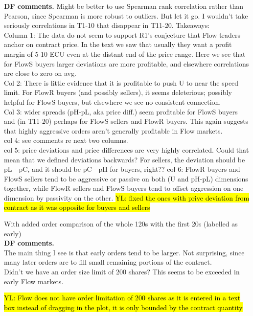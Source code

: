 \documentclass{article}
\begin{document}
\textbf{DF comments.} Might be better to use Spearman rank correlation rather than Pearson,
since Spearman is more robust to outliers. But let it go. 
I wouldn't take seriously correlations in T1-10 that disappear in T11-20.
Takeaways: \\
Column 1: The data do not seem to support R1's conjecture that Flow traders anchor on contract price. In the text we saw that usually they want a profit margin of 5-10 ECU even at the distant end of the price range. Here we see that for FlowS buyers larger deviations are more profitable, and elsewhere correlations are close to zero on avg.\\
Col 2: There is little evidence that it is profitable to push U to near the speed limit. For FlowR buyers (and possibly sellers), it seems deleterious;  possibly helpful for FlowS buyers, but elsewhere we see no consistent connection. \\
Col 3: wider spreads (pH-pL, aka price diff.) seem profitable for FlowS buyers and (in T11-20) perhaps for FlowS sellers and FlowR buyers.
This again suggests that highly aggressive orders aren't generally profitable in Flow markets. \\
col 4: see comments re next two columns. \\
col 5: price deviations and price differences are very highly correlated.
Could that mean that we defined deviations backwards?
For sellers, the deviation should be pL - pC, and it should be pC - pH for buyers, right?? 
col 6: FlowR buyers and FlowS sellers tend to be aggressive or passive on both (U and pH-pL) dimensions together, while FlowR sellers and FlowS buyers tend to offset aggression on one dimension by passivity on the other. 
\hl{YL: fixed the ones with prive deviation from contract as it was opposite for buyers and sellers}

\bigskip

With added order comparison of the whole 120s with the first 20s (labelled as early)\\

\textbf{DF comments.}\\
The main thing I see is that early orders tend to be larger. 
Not surprising, since many later orders are to fill small remaining portions of the contract.\\
Didn't we have an order size limit of 200 shares? This seems to be exceeded in early Flow markets.

\hl{YL: Flow does not have order limitation of 200 shares as it is entered in a text box instead of dragging in the plot, it is only bounded by the contract quantity}
\end{document}
